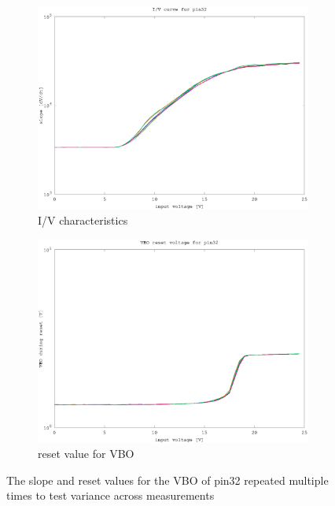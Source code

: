 \begin{figure}[h]
	\centering
	\begin{subfigure}[b]{0.475\textwidth}
	    \centering
	    \includegraphics[width=\textwidth]{fig/pin32_slope_0-25V.eps}
	    \caption[Network2]%
	    {I/V characteristics}    
	    \label{fig:pin32_slope}
	\end{subfigure}
	\hfill
	\begin{subfigure}[b]{0.475\textwidth}  
	    \centering 
	    \includegraphics[width=\textwidth]{fig/pin32_reset_0-25V.eps}
	    \caption[]%
	    {reset value for VBO}    
	    \label{fig:pin32_reset}
	\end{subfigure}
	\caption{The slope and reset values for the VBO of pin32 repeated multiple times to test variance across measurements}
	\label{fig:pin32}
\end{figure}


